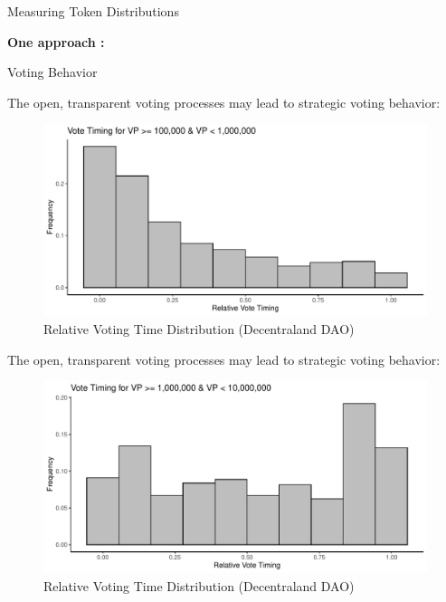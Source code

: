 \documentclass[]{beamer}
\begin{document}
\begin{frame}{Measuring Token Distributions}
	
	\textbf{One approach \cite{nadlerDecentralized2020}:}
	
	
	
\end{frame}

\begin{frame}[allowframebreaks]{Voting Behavior}

	The open, transparent voting processes may lead to strategic voting behavior:

	\begin{figure}
		\center
		\includegraphics[width=\textwidth]{../assets/figures/governanceHist4.pdf}
		\caption{Relative Voting Time Distribution (Decentraland DAO) \cite{goldbergMetaverse2023}}
	\end{figure}

	\framebreak
	
	The open, transparent voting processes may lead to strategic voting behavior:

	\begin{figure}
		\center
		\includegraphics[width=\textwidth]{../assets/figures/governanceHist5.pdf}
		\caption{Relative Voting Time Distribution (Decentraland DAO) \cite{goldbergMetaverse2023}}
	\end{figure}


\end{frame}
\end{document}
